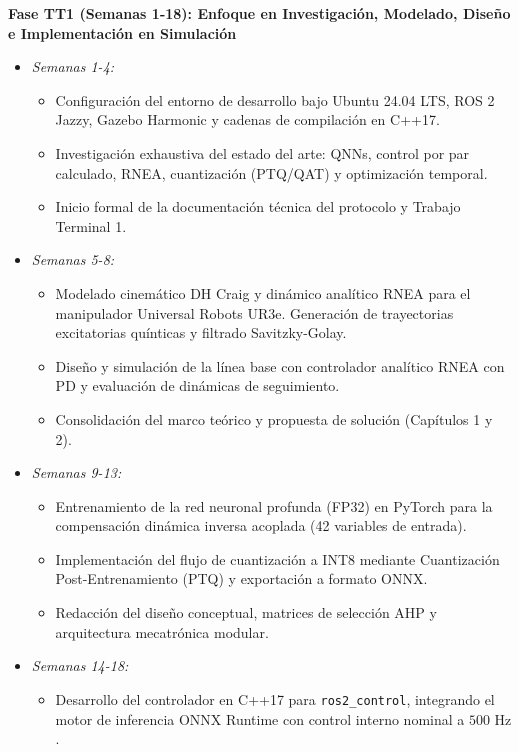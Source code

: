 \documentclass[12pt]{article}
\begin{document}
\textbf{Fase TT1 (Semanas 1-18): Enfoque en Investigación, Modelado, Diseño e Implementación en Simulación}
\begin{itemize}
    \item \textit{Semanas 1-4:}
        \begin{itemize}
            \item [EP01] Configuración del entorno de desarrollo bajo Ubuntu 24.04 LTS, ROS 2 Jazzy, Gazebo Harmonic y cadenas de compilación en C++17.
            \item [INV01] Investigación exhaustiva del estado del arte: QNNs, control por par calculado, RNEA, cuantización (PTQ/QAT) y optimización temporal.
            \item [DOC1] Inicio formal de la documentación técnica del protocolo y Trabajo Terminal 1.
        \end{itemize}
    \item \textit{Semanas 5-8:}
        \begin{itemize}
            \item [EP03] Modelado cinemático DH Craig y dinámico analítico RNEA para el manipulador Universal Robots UR3e. Generación de trayectorias excitatorias quínticas y filtrado Savitzky-Golay.
            \item [EP02] Diseño y simulación de la línea base con controlador analítico RNEA con PD y evaluación de dinámicas de seguimiento.
            \item [DOC1] Consolidación del marco teórico y propuesta de solución (Capítulos 1 y 2).
        \end{itemize}
    \item \textit{Semanas 9-13:}
        \begin{itemize}
            \item [EP03] Entrenamiento de la red neuronal profunda (FP32) en PyTorch para la compensación dinámica inversa acoplada (42 variables de entrada).
            \item [EP05] Implementación del flujo de cuantización a INT8 mediante Cuantización Post-Entrenamiento (PTQ) y exportación a formato ONNX.
            \item [DOC1] Redacción del diseño conceptual, matrices de selección AHP y arquitectura mecatrónica modular.
        \end{itemize}
    \item \textit{Semanas 14-18:}
        \begin{itemize}
            \item [EP04] Desarrollo del controlador en C++17 para \texttt{ros2\_control}, integrando el motor de inferencia ONNX Runtime con control interno nominal a $500\text{ Hz}$.

\end{itemize}
\end{itemize}
\end{document}
